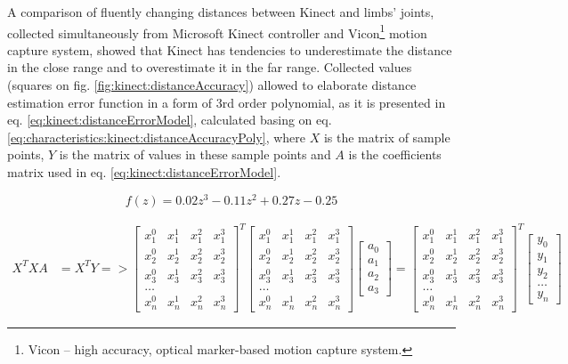 \documentclass[sensors,article,submit,moreauthors,pdftex,10pt,a4paper]{mdpi}
\begin{document}
A comparison of fluently changing distances between Kinect and limbs' joints, collected simultaneously from Microsoft Kinect controller and Vicon\footnote{Vicon -- high accuracy, optical marker-based motion capture system.} motion capture system, showed that Kinect has tendencies to underestimate the distance in the close range and to overestimate it in the far range. Collected values (squares on fig. \ref{fig:kinect:distanceAccuracy}) allowed to elaborate distance estimation error function in a form of 3rd order polynomial, as it is presented in eq. \ref{eq:kinect:distanceErrorModel}, calculated basing on eq. \ref{eq:characteristics:kinect:distanceAccuracyPoly}, where $X$ is the matrix of sample points, $Y$ is the matrix of values in these sample points and $A$ is the coefficients matrix used in eq. \ref{eq:kinect:distanceErrorModel}. 

\begin{equation}
	f(z)=0.02z^3-0.11z^2+0.27z-0.25 
	\label{eq:kinect:distanceErrorModel}
\end{equation}

\begin{equation}
	\begin{split}
		X^TXA &= X^TY => \begin{bmatrix}
		x_1^0&x_1^1&x_1^2&x_1^3\\
		x_2^0&x_2^1&x_2^2&x_2^3\\
		x_3^0&x_3^1&x_3^2&x_3^3\\
		\dots\\
		x_n^0&x_n^1&x_n^2&x_n^3
		\end{bmatrix}^T
		\begin{bmatrix}
			x_1^0 & x_1^1 & x_1^2 & x_1^3 \\
			x_2^0 & x_2^1 & x_2^2 & x_2^3 \\
			x_3^0 & x_3^1 & x_3^2 & x_3^3 \\
			\dots\\
			x_n^0 & x_n^1 & x_n^2 & x_n^3 
		\end{bmatrix}
		\begin{bmatrix}
			a_0 \\a_1\\a_2\\a_3
		\end{bmatrix}
		=
		\begin{bmatrix}
			x_1^0 & x_1^1 & x_1^2 & x_1^3 \\
			x_2^0 & x_2^1 & x_2^2 & x_2^3 \\
			x_3^0 & x_3^1 & x_3^2 & x_3^3 \\
			\dots\\
			x_n^0 & x_n^1 & x_n^2 & x_n^3 
		\end{bmatrix}^T
		\begin{bmatrix}
			y_0 \\y_1\\y_2\\\dots\\y_n
		\end{bmatrix} 
	\end{split}
	\label{eq:characteristics:kinect:distanceAccuracyPoly}
\end{equation}
\end{document}
